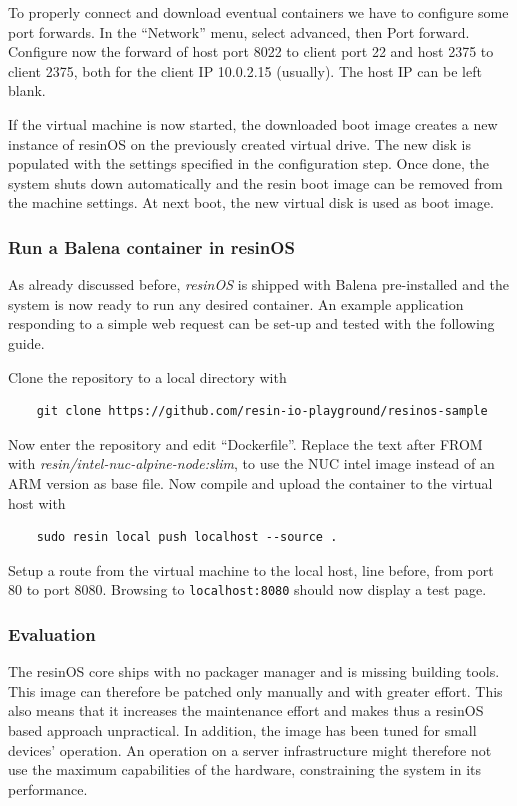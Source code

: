 \documentclass[]{scrartcl}
\begin{document}
To properly connect and download eventual containers we have to configure some port forwards. In the ``Network'' menu, select advanced, then Port forward. Configure now the forward of host port 8022 to client port 22 and host 2375 to client 2375, both for the client IP 10.0.2.15 (usually). The host IP can be left blank.

If the virtual machine is now started, the downloaded boot image creates a new instance of resinOS on the previously created virtual drive. The new disk is populated with the settings specified in the configuration step. Once done, the system shuts down automatically and the resin boot image can be removed from the machine settings. At next boot, the new virtual disk is used as boot image.

\subsubsection{Run a Balena container in resinOS}

As already discussed before, \textit{resinOS} is shipped with Balena pre-installed and the system is now ready to run any desired container. 
An example application responding to a simple web request can be set-up and tested with the following guide.

Clone the repository to a local directory with
\begin{verbatim}
	git clone https://github.com/resin-io-playground/resinos-sample
\end{verbatim}

Now enter the repository and edit ``Dockerfile''. Replace the text after FROM with \textit{resin/intel-nuc-alpine-node:slim}, to use the NUC intel image instead of an ARM version as base file. Now compile and upload the container to the virtual host with

\begin{verbatim}
	sudo resin local push localhost --source .
\end{verbatim}

Setup a route from the virtual machine to the local host, line before, from port 80 to port 8080. Browsing to \texttt{localhost:8080} should now display a test page.

\subsubsection{Evaluation}

The resinOS core ships with no packager manager and is missing building tools. This image can therefore be patched only manually and with greater effort. This also means that it increases the maintenance effort and makes thus a resinOS based approach unpractical. In addition, the image has been tuned for small devices' operation. An operation on a server infrastructure might therefore not use the maximum capabilities of the hardware, constraining the system in its performance.
\end{document}
